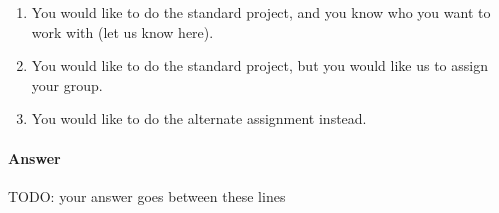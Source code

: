 \documentclass{article}
\begin{document}
\begin{enumerate}
    \item You would like to do the standard project, and you know who you want
        to work with (let us know here).
    \item You would like to do the standard project, but you would like us to
        assign your group.
    \item You would like to do the alternate assignment instead.
\end{enumerate}

\paragraph{Answer}


TODO: your answer goes between these lines

\end{document}

